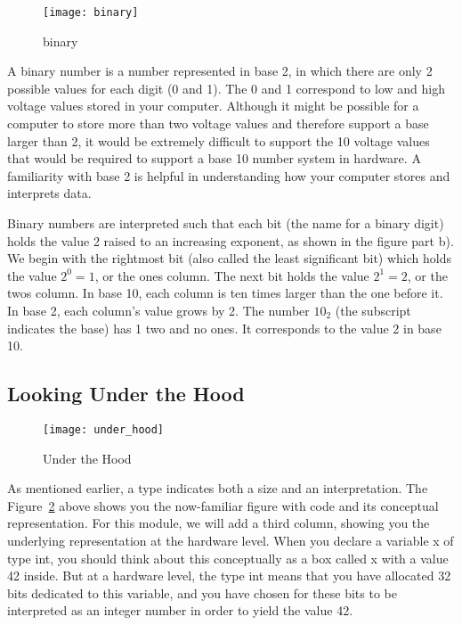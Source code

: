 \documentclass[11pt, a4paper]{article}
\begin{document}
\begin{figure}[htpb]
  \centering
  \texttt{[image: binary]}
  \caption{binary}
  \label{fig:binary}
\end{figure}

A binary number is a number represented in base 2, in which there are only 2 possible values for each digit (0 and 1). The 0 and 1 correspond to low and high voltage values stored in your computer. Although it might be possible for a computer to store more than two voltage values and therefore support a base larger than 2, it would be extremely difficult to support the 10 voltage values that would be required to support a base 10 number system in hardware. A familiarity with base 2 is helpful in understanding how your computer stores and interprets data.

Binary numbers are interpreted such that each bit (the name for a binary digit) holds the value 2 raised to an increasing exponent, as shown in the figure part b). We begin with the rightmost bit (also called the least significant bit) which holds the value $2^{0}=1$, or the ones column. The next bit holds the value $2^{1}=2$, or the twos column. In base 10, each column is ten times larger than the one before it. In base 2, each column’s value grows by 2. The number $10_{2}$ (the subscript indicates the base) has 1 two and no ones. It corresponds to the value 2 in base 10.




\subsection{Looking Under the Hood}%
\label{sub:looking_under_the_hood}


\begin{figure}[htpb]
  \centering
  \texttt{[image: under\_hood]}
  \caption{Under the Hood}
  \label{fig:under_hood}
\end{figure}


As mentioned earlier, a type indicates both a size and an interpretation. The Figure~\ref{fig:under_hood} above shows you the now-familiar figure with code and its conceptual representation. For this module, we will add a third column, showing you the underlying representation at the hardware level. When you declare a variable x of type int, you should think about this conceptually as a box called x with a value 42 inside. But at a hardware level, the type int means that you have allocated 32 bits dedicated to this variable, and you have chosen for these bits to be interpreted as an integer number in order to yield the value 42.
\end{document}
